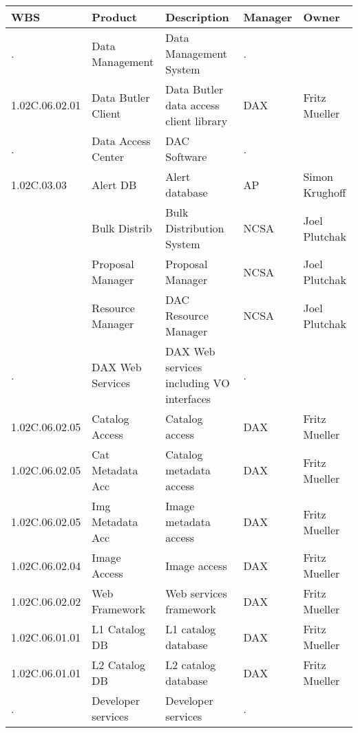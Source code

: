 \begin{longtable}{|p{}|p{}|p{}|p{}|p{}|}\hline 
 \bf WBS & Product & Description & Manager & Owner \\ \hline   
{\tiny .} & \small Data Management & Data Management System & . & \\ \hline 
{\tiny 1.02C.06.02.01} & \small Data Butler Client & Data Butler data access client library & DAX & Fritz Mueller\\ \hline 
{\tiny .} & \small Data Access Center & DAC Software & . & \\ \hline 
{\tiny 1.02C.03.03} & \small Alert DB & Alert database & AP & Simon Krughoff\\ \hline 
{\tiny } & \small Bulk Distrib & Bulk Distribution System & NCSA & Joel Plutchak\\ \hline 
{\tiny } & \small Proposal Manager & Proposal Manager & NCSA & Joel Plutchak\\ \hline 
{\tiny } & \small Resource Manager & DAC Resource Manager & NCSA & Joel Plutchak\\ \hline 
{\tiny .} & \small DAX Web Services & DAX Web services including VO interfaces & . & \\ \hline 
{\tiny 1.02C.06.02.05} & \small Catalog Access & Catalog access & DAX & Fritz Mueller\\ \hline 
{\tiny 1.02C.06.02.05} & \small Cat Metadata Acc & Catalog metadata access & DAX & Fritz Mueller\\ \hline 
{\tiny 1.02C.06.02.05} & \small Img Metadata Acc & Image metadata access & DAX & Fritz Mueller\\ \hline 
{\tiny 1.02C.06.02.04} & \small Image Access & Image access & DAX & Fritz Mueller\\ \hline 
{\tiny 1.02C.06.02.02} & \small Web Framework & Web services framework & DAX & Fritz Mueller\\ \hline 
{\tiny 1.02C.06.01.01} & \small L1 Catalog DB & L1 catalog database & DAX & Fritz Mueller\\ \hline 
{\tiny 1.02C.06.01.01} & \small L2 Catalog DB & L2 catalog database & DAX & Fritz Mueller\\ \hline 
{\tiny .} & \small Developer services & Developer services & . & \\ \hline 

\end{longtable}
